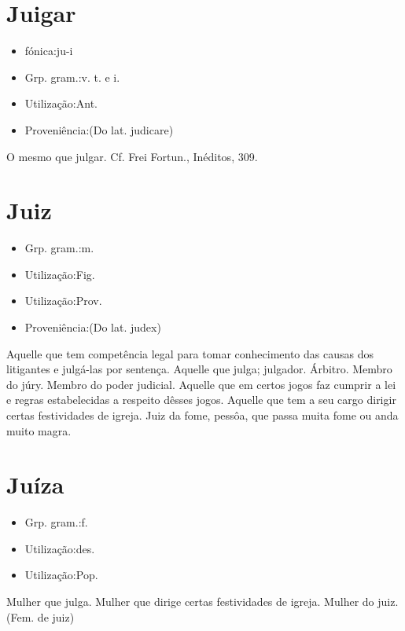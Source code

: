 \documentclass{article}
\begin{document}
\section{Juigar}
\begin{itemize}
\item {fónica:ju-i}
\end{itemize}
\begin{itemize}
\item {Grp. gram.:v. t.  e  i.}
\end{itemize}
\begin{itemize}
\item {Utilização:Ant.}
\end{itemize}
\begin{itemize}
\item {Proveniência:(Do lat. \textunderscore judicare\textunderscore )}
\end{itemize}
O mesmo que \textunderscore julgar\textunderscore . Cf. Frei Fortun., \textunderscore Inéditos\textunderscore , 309.
\section{Juiz}
\begin{itemize}
\item {Grp. gram.:m.}
\end{itemize}
\begin{itemize}
\item {Utilização:Fig.}
\end{itemize}
\begin{itemize}
\item {Utilização:Prov.}
\end{itemize}
\begin{itemize}
\item {Proveniência:(Do lat. \textunderscore judex\textunderscore )}
\end{itemize}
Aquelle que tem competência legal para tomar conhecimento das causas dos litigantes e julgá-las por sentença.
Aquelle que julga; julgador.
Árbitro.
Membro do júry.
Membro do poder judicial.
Aquelle que em certos jogos faz cumprir a lei e regras estabelecidas a respeito dêsses jogos.
Aquelle que tem a seu cargo dirigir certas festividades de igreja.
\textunderscore Juiz da fome\textunderscore , pessôa, que passa muita fome ou anda muito magra.
\section{Juíza}
\begin{itemize}
\item {Grp. gram.:f.}
\end{itemize}
\begin{itemize}
\item {Utilização:des.}
\end{itemize}
\begin{itemize}
\item {Utilização:Pop.}
\end{itemize}
Mulher que julga.
Mulher que dirige certas festividades de igreja.
Mulher do juiz.
(Fem. de \textunderscore juiz\textunderscore )
\end{document}
